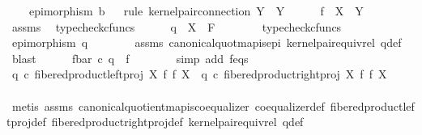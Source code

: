 \begin{isabellebody}
\ \ \ \ epimorphism\ b{\isachardoublequoteclose}\isanewline
\ \ \isamarkupfalse%
{\isacharparenleft}{\kern0pt}rule\ kernel{\isacharunderscore}{\kern0pt}pair{\isacharunderscore}{\kern0pt}connection{\isacharbrackleft}{\kern0pt}\ Y\ {\isacharequal}{\kern0pt}\ Y{\isacharbrackright}{\kern0pt}{\isacharparenright}{\kern0pt}\isanewline
\ \ \ \ \isamarkupfalse%
\ {\isachardoublequoteopen}f\ {\isacharcolon}{\kern0pt}\ X\ {\isasymrightarrow}\ Y{\isachardoublequoteclose}\isanewline
\ \ \ \ \ \ \isamarkupfalse%
\ assms\ \isamarkupfalse%
\ typecheck{\isacharunderscore}{\kern0pt}cfuncs\isanewline
\ \ \ \ \isamarkupfalse%
\ {\isachardoublequoteopen}q\ {\isacharcolon}{\kern0pt}\ X\ {\isasymrightarrow}\ F{\isachardoublequoteclose}\isanewline
\ \ \ \ \ \ \isamarkupfalse%
\ typecheck{\isacharunderscore}{\kern0pt}cfuncs\isanewline
\ \ \ \ \isamarkupfalse%
\ {\isachardoublequoteopen}epimorphism\ q{\isachardoublequoteclose}\isanewline
\ \ \ \ \ \ \isamarkupfalse%
\ assms{\isacharparenleft}{\kern0pt}{}{\isacharparenright}{\kern0pt}\ canonical{\isacharunderscore}{\kern0pt}quot{\isacharunderscore}{\kern0pt}map{\isacharunderscore}{\kern0pt}is{\isacharunderscore}{\kern0pt}epi\ kernel{\isacharunderscore}{\kern0pt}pair{\isacharunderscore}{\kern0pt}equiv{\isacharunderscore}{\kern0pt}rel\ q{\isacharunderscore}{\kern0pt}def\ \isamarkupfalse%
\ blast\isanewline
\ \ \ \ \isamarkupfalse%
\ {\isachardoublequoteopen}f{\isacharunderscore}{\kern0pt}bar\ {\isasymcirc}\isactrlsub c\ q\ {\isacharequal}{\kern0pt}\ f{\isachardoublequoteclose}\isanewline
\ \ \ \ \ \ \isamarkupfalse%
\ {\isacharparenleft}{\kern0pt}simp\ add{\isacharcolon}{\kern0pt}\ f{\isacharunderscore}{\kern0pt}eqs{\isacharparenright}{\kern0pt}\isanewline
\ \ \ \ \isamarkupfalse%
\ {\isachardoublequoteopen}q\ {\isasymcirc}\isactrlsub c\ fibered{\isacharunderscore}{\kern0pt}product{\isacharunderscore}{\kern0pt}left{\isacharunderscore}{\kern0pt}proj\ X\ f\ f\ X\ {\isacharequal}{\kern0pt}\ q\ {\isasymcirc}\isactrlsub c\ fibered{\isacharunderscore}{\kern0pt}product{\isacharunderscore}{\kern0pt}right{\isacharunderscore}{\kern0pt}proj\ X\ f\ f\ X{\isachardoublequoteclose}\isanewline
\ \ \ \ \ \ \isamarkupfalse%
\ {\isacharparenleft}{\kern0pt}metis\ assms{\isacharparenleft}{\kern0pt}{}{\isacharparenright}{\kern0pt}\ canonical{\isacharunderscore}{\kern0pt}quotient{\isacharunderscore}{\kern0pt}map{\isacharunderscore}{\kern0pt}is{\isacharunderscore}{\kern0pt}coequalizer\ coequalizer{\isacharunderscore}{\kern0pt}def\ fibered{\isacharunderscore}{\kern0pt}product{\isacharunderscore}{\kern0pt}left{\isacharunderscore}{\kern0pt}proj{\isacharunderscore}{\kern0pt}def\ fibered{\isacharunderscore}{\kern0pt}product{\isacharunderscore}{\kern0pt}right{\isacharunderscore}{\kern0pt}proj{\isacharunderscore}{\kern0pt}def\ kernel{\isacharunderscore}{\kern0pt}pair{\isacharunderscore}{\kern0pt}equiv{\isacharunderscore}{\kern0pt}rel\ q{\isacharunderscore}{\kern0pt}def{\isacharparenright}{\kern0pt}\isanewline

\end{isabellebody}
